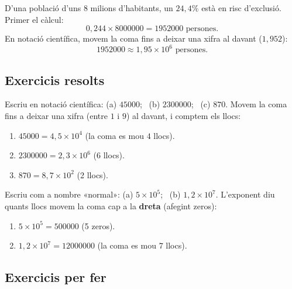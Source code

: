 \begin{exemple}
D'una població d'uns $8$ milions d'habitants, un $24,4\%$ està en risc d'exclusió.
Primer el càlcul:
\[
0,244\times\num{8000000}=\num{1952000}\text{ persones}.
\]
En notació científica, movem la coma fins a deixar una xifra al davant ($1,952$):
\[
\num{1952000}\approx 1{,}95\times 10^{6}\text{ persones}.
\]
\end{exemple}

\subsection{Exercicis resolts}

\begin{exresolt}
Escriu en notació científica: (a) $\num{45000}$; \ (b) $\num{2300000}$; \
(c) $\num{870}$.
\solucio
Movem la coma fins a deixar una xifra (entre $1$ i $9$) al davant, i comptem els llocs:
\begin{enumerate}[label=\alph*), leftmargin=1.6em]
  \item $\num{45000}=4,5\times 10^{4}$ (la coma es mou $4$ llocs).
  \item $\num{2300000}=2,3\times 10^{6}$ (6 llocs).
  \item $\num{870}=8,7\times 10^{2}$ (2 llocs).
\end{enumerate}
\end{exresolt}

\begin{exresolt}
Escriu com a nombre «normal»: (a) $5\times 10^{5}$; \ (b) $1,2\times 10^{7}$.
\solucio
L'exponent diu quants llocs movem la coma cap a la \textbf{dreta} (afegint zeros):
\begin{enumerate}[label=\alph*), leftmargin=1.6em]
  \item $5\times 10^{5}=\num{500000}$ (5 zeros).
  \item $1,2\times 10^{7}=\num{12000000}$ (la coma es mou $7$ llocs).
\end{enumerate}
\end{exresolt}

\subsection{Exercicis per fer}

